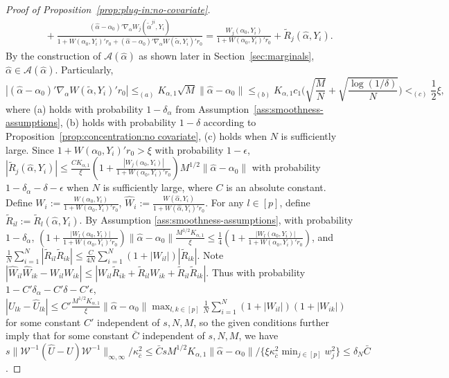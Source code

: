 \documentclass[11pt]{article}
\begin{document}
\begin{proof}[Proof of Proposition~\ref{prop:plug-in:no-covariate}]
$$\begin{array}{rl}
&\displaystyle\quad + \frac{(\hat\alpha-\alpha_0)'\nabla_\alpha W_j(\tilde \alpha^{ji},Y_i)}{1+W(\alpha_0,Y_i)'r_0 + (\hat\alpha-\alpha_0)'\nabla_\alpha W(\tilde \alpha,Y_i)'r_0} = \frac{W_j(\alpha_0,Y_i) }{1+W(\alpha_0,Y_i)'r_0} + \widetilde R_j(\hat\alpha,Y_i).
\end{array}$$ 
By the construction of $\mathcal{A}(\hat{\alpha})$ as shown later in Section~\ref{sec:marginals}, $\hat{\alpha}\in\mathcal{A}(\hat{\alpha})$. Particularly, 
$$|(\hat\alpha-\alpha_0)'\nabla_\alpha W(\tilde \alpha,Y_i)'r_0|\leq_{(a)} K_{\alpha,1}\sqrt{M}\|\hat\alpha-\alpha_0\|\leq_{(b)}K_{\alpha,1}c_1\bigg(\sqrt{\frac{M}{N}}+\sqrt{\frac{\log(1/\delta)}{N}}\bigg)<_{(c)}\frac{1}{2}\xi,$$ 
where (a) holds with probability $1-\delta_{\alpha}$ from Assumption~\ref{ass:smoothness-assumptions}, (b) holds with probability $1-\delta$ according to Proposition~\ref{prop:concentration:no covariate}, (c) holds when $N$ is sufficiently large. Since $1+W(\alpha_0,Y_i)'r_0>\xi$ with probability $1-\epsilon$, $|\widetilde R_j(\hat\alpha,Y_i)|\leq \frac{CK_{\alpha,1}}{\xi}\left(1+\frac{|W_j(\alpha_0,Y_i)|}{1+W(\alpha_0,Y_i)'r_0}\right)M^{1/2}\|\hat\alpha-\alpha_0\|$ with probability $1-\delta_\alpha-\delta-\epsilon$ when $N$ is sufficiently large, where $C$ is an absolute constant.
Define $W_i := \frac{W(\alpha_0,Y_i)}{1+W(\alpha_0,Y_i)'r_0}$, $\hat W_i := \frac{W(\hat \alpha,Y_i)}{1+W(\hat \alpha,Y_i)'r_0}$. For any $l\in[p]$, define $\tilde R_{il}:=\tilde{R}_l(\hat{\alpha},Y_i)$. By Assumption \ref{ass:smoothness-assumptions}, with probability $1-\delta_\alpha$, $\left(1+\frac{|W_l(\alpha_0,Y_i)| }{1+W(\alpha_0,Y_i)'r_0}\right)\|\hat\alpha - \alpha_0\|\frac{M^{1/2}K_{\alpha,1}}{\xi} \leq\frac{1}{4}\left(1+\frac{|W_l(\alpha_0,Y_i)|}{1+W(\alpha_0,Y_i)'r_0}\right)$, and $\frac{1}{N}\sum_{i=1}^N |\tilde R_{il}\tilde R_{ik}|\leq\frac{C}{4N}\sum_{i=1}^N (1+|W_{il}|)|\tilde R_{ik}|$. Note $|\hat W_{il}\hat W_{ik} -W_{il}W_{ik}| \leq \left| W_{il}\tilde R_{ik} + \tilde R_{il} W_{ik} + \tilde R_{il}\tilde R_{ik}\right|$. Thus with probability $1-C'\delta_{\alpha}-C'\delta-C'\epsilon$, $\displaystyle\left| U_{lk} - \hat U_{lk} \right| \leq C'\frac{M^{1/2}K_{\alpha,1}}{\xi}\|\hat\alpha - \alpha_0\|\max_{l,k\in[p]}\frac{1}{N}\sum_{i=1}^N  \left(1+| W_{il}|\right)\left(1+| W_{ik}|\right)$ for some constant $C'$ independent of $s,N,M$, so the given conditions further imply that for some constant $\bar{C}$ independent of $s,N,M$, we have $s\|\mathcal{W}^{-1}(\hat U - U)\mathcal{W}^{-1} \|_{\infty,\infty}/\kappa_{\bar{c}}^2\leq \bar{C}sM^{1/2}K_{\alpha,1}\|\hat\alpha-\alpha_0\|/\{\xi\kappa_{\bar c}^2 \min_{j\in[p]} w_j^2\}\leq\delta_N\bar{C}$.

\end{proof}
\end{document}
